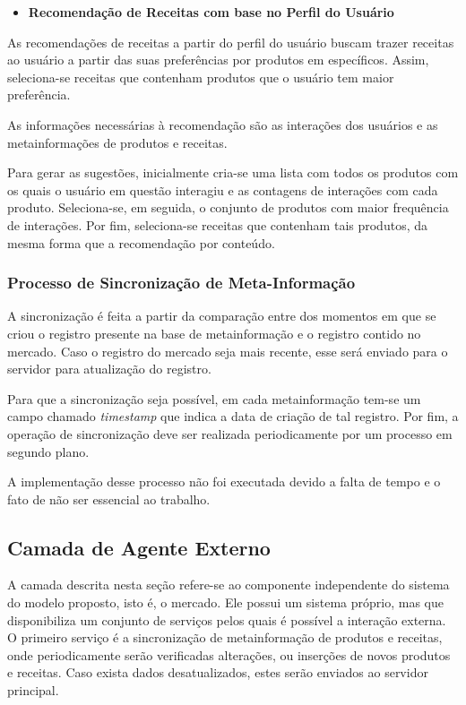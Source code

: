 \begin{itemize} 
    \item \textbf{Recomendação de Receitas com base no Perfil do Usuário}
\end{itemize}

As recomendações de receitas a partir do perfil do usuário buscam trazer receitas ao usuário a partir das suas preferências por produtos em específicos. Assim, seleciona-se receitas que contenham produtos que o usuário tem maior preferência.

As informações necessárias à recomendação são as interações dos usuários e as metainformações de produtos e receitas.

Para gerar as sugestões, inicialmente cria-se uma lista com todos os produtos com os quais o usuário em questão interagiu e as contagens de interações com cada produto. Seleciona-se, em seguida, o conjunto de produtos com maior frequência de interações. Por fim, seleciona-se receitas que contenham tais produtos, da mesma forma que a recomendação por conteúdo.

\subsubsection{Processo de Sincronização de Meta-Informação}

A sincronização é feita a partir da comparação entre dos momentos em que se criou o registro presente na base de metainformação e o registro contido no mercado. Caso o registro do mercado seja mais recente, esse será enviado para o servidor para atualização do registro. 

Para que a sincronização seja possível, em cada metainformação tem-se um campo chamado  \textit{timestamp} que indica a data de criação de tal registro.
Por fim, a operação de sincronização deve ser realizada periodicamente por um processo em segundo plano.

A implementação desse processo não foi executada devido a falta de tempo e o fato de não ser essencial ao trabalho.


\subsection{Camada de Agente Externo}

A camada descrita nesta seção refere-se ao componente independente do sistema do modelo proposto, isto é, o mercado. Ele possui um sistema próprio, mas que disponibiliza um conjunto de serviços pelos quais é possível a interação externa. O primeiro serviço é a sincronização de metainformação de produtos e receitas, onde periodicamente serão verificadas alterações, ou inserções de novos produtos e receitas. Caso exista dados desatualizados, estes serão enviados ao servidor principal.

